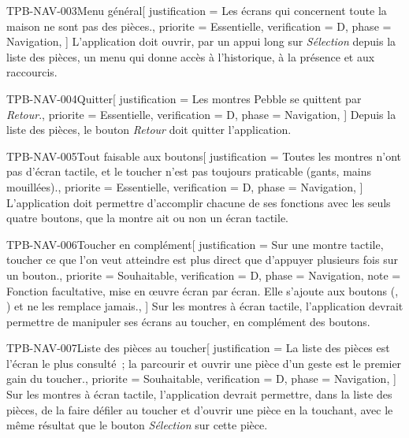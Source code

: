 \begin{exigence}{TPB-NAV-003}{Menu général}[
    justification = {Les écrans qui concernent toute la maison ne sont pas des pièces.},
    priorite      = {Essentielle},
    verification  = {D},
    phase         = {Navigation},
  ]
  L'application doit ouvrir, par un appui long sur \emph{Sélection} depuis la liste des
  pièces, un menu qui donne accès à l'historique, à la présence et aux raccourcis.
\end{exigence}

\begin{exigence}{TPB-NAV-004}{Quitter}[
    justification = {Les montres Pebble se quittent par \emph{Retour}.},
    priorite      = {Essentielle},
    verification  = {D},
    phase         = {Navigation},
  ]
  Depuis la liste des pièces, le bouton \emph{Retour} doit quitter l'application.
\end{exigence}

\begin{exigence}{TPB-NAV-005}{Tout faisable aux boutons}[
    justification = {Toutes les montres n'ont pas d'écran tactile, et le toucher n'est
                     pas toujours praticable (gants, mains mouillées).},
    priorite      = {Essentielle},
    verification  = {D},
    phase         = {Navigation},
  ]
  L'application doit permettre d'accomplir chacune de ses fonctions avec les seuls quatre
  boutons, que la montre ait ou non un écran tactile.
\end{exigence}

\begin{exigence}{TPB-NAV-006}{Toucher en complément}[
    justification = {Sur une montre tactile, toucher ce que l'on veut atteindre est plus
                     direct que d'appuyer plusieurs fois sur un bouton.},
    priorite      = {Souhaitable},
    verification  = {D},
    phase         = {Navigation},
    note          = {Fonction facultative, mise en \oe uvre écran par écran. Elle s'ajoute aux
                     boutons (, ) et ne les remplace
                     jamais.},
  ]
  Sur les montres à écran tactile, l'application devrait permettre de manipuler ses écrans
  au toucher, en complément des boutons.
\end{exigence}

\begin{exigence}{TPB-NAV-007}{Liste des pièces au toucher}[
    justification = {La liste des pièces est l'écran le plus consulté~; la parcourir et
                     ouvrir une pièce d'un geste est le premier gain du toucher.},
    priorite      = {Souhaitable},
    verification  = {D},
    phase         = {Navigation},
  ]
  Sur les montres à écran tactile, l'application devrait permettre, dans la liste des
  pièces, de la faire défiler au toucher et d'ouvrir une pièce en la touchant, avec le même
  résultat que le bouton \emph{Sélection} sur cette pièce.
\end{exigence}

